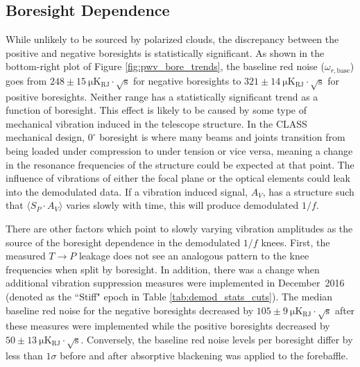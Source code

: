 \documentclass[twocolumn, tighten, numberedappendix, twocolappendix]{aastex63}
\begin{document}
\subsection{Boresight Dependence}

While unlikely to be sourced by polarized clouds, the discrepancy between the positive and negative boresights is statistically significant. As shown in the bottom-right plot of Figure \ref{fig:pwv_bore_trends}, the baseline red noise ($\omega_{r,\mathrm{base}}$) goes from $248\pm15~\mathrm{\mu K_{RJ} \cdot \sqrt{s}}$ for negative boresights to $321\pm14~\mathrm{\mu K_{RJ} \cdot \sqrt{s}}$ for positive boresights. Neither range has a statistically significant trend as a function of boresight. This effect is likely to be caused by some type of mechanical vibration induced in the telescope structure. In the CLASS mechanical design, $0^\circ$ boresight is where many beams and joints transition  from being loaded under compression to under tension or vice versa, meaning a change in the resonance frequencies of the structure could be expected at that point. The influence of vibrations of either the focal plane or the optical elements could leak into the demodulated data. If a vibration induced signal, $A_V$, has a structure such that $\langle S_P \cdot A_V\rangle$ varies slowly with time, this will produce demodulated $1/f$. 

There are other factors which point to slowly varying vibration amplitudes as the source of the boresight dependence in the demodulated $1/f$ knees. First, the measured $T\rightarrow P$ leakage does not see an analogous pattern to the knee frequencies when split by boresight. In addition, there was a change when additional vibration suppression measures were implemented in December~2016 (denoted as the ``Stiff" epoch in Table \ref{tab:demod_stats_cuts}). The median baseline red noise for the negative boresights decreased by $105\pm9~\mathrm{\mu K_{RJ} \cdot \sqrt{s}}$ after these measures were implemented while the positive boresights decreased by $50\pm13~\mathrm{\mu K_{RJ} \cdot \sqrt{s}}$. Conversely, the baseline red noise levels per boresight differ by less than $1\sigma$ before and after absorptive blackening was applied to the forebaffle.
\end{document}
